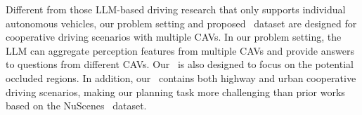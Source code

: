 Different from those LLM-based driving research that only supports individual autonomous vehicles, our problem setting and proposed \namedataset~dataset are designed for cooperative driving scenarios with multiple CAVs. In our problem setting, the LLM can aggregate perception features from multiple CAVs and provide answers to questions from different CAVs. Our \namedataset~is also designed to focus on the potential occluded regions. In addition, our \namedataset~contains both highway and urban cooperative driving scenarios, making our planning task more challenging than prior works based on the NuScenes~\cite{caesar2019nuscenes} dataset.
